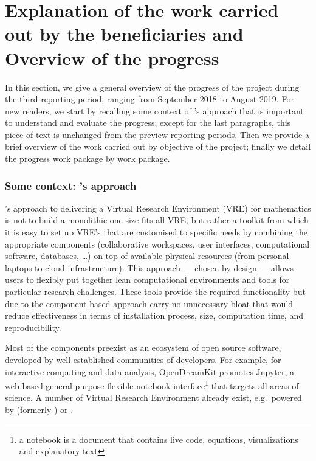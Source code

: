 \section{Explanation of the work carried out by the beneficiaries and Overview of the progress}

In this section, we give a general overview of the progress of the
project during the third reporting period, ranging from September 2018
to August 2019. For new readers, we start by recalling some context of
\ODK's approach that is important to understand and evaluate the
progress; except for the last paragraphs, this piece of text is
unchanged from the preview reporting periods. Then we provide a brief
overview of the work carried out by objective of the project; finally
we detail the progress work package by work package.

\subsubsection*{Some context: \ODK's approach}
\ODK's approach to delivering a Virtual Research Environment (VRE) for
mathematics is not to build a monolithic one-size-fits-all VRE, but
rather a toolkit from which it is easy to set up VRE's that are
customised to specific needs by combining the appropriate components
(collaborative workspaces, user interfaces, computational software,
databases, \dots) on top of available physical resources (from
personal laptops to cloud infrastructure). This approach --- chosen by
design --- allows users to flexibly put together lean computational
environments and tools for particular research challenges. These tools
provide the required functionality but due to the component based
approach carry no unnecessary bloat that would reduce effectiveness in
terms of installation process, size, computation time, and
reproducibility.

Most of the components preexist as an ecosystem of open source
software, developed by well established communities of developers. For
example, for interactive computing and data analysis, OpenDreamKit
promotes Jupyter, a web-based general purpose flexible notebook
interface\footnote{a notebook is a document that contains live code,
  equations, visualizations and explanatory text} that targets all
areas of science. A number of Virtual Research Environment already
exist, e.g.\ powered by \cocalc (formerly \SMC) or \JupyterHub.

